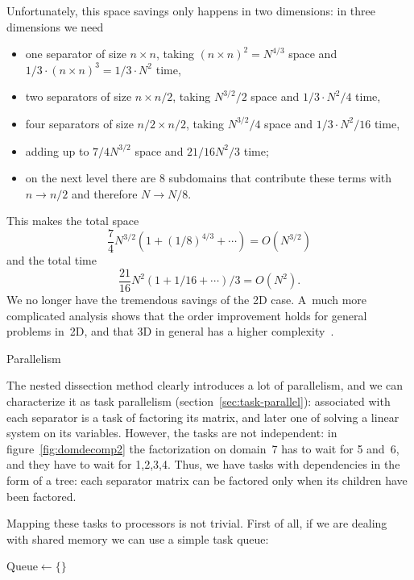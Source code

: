 Unfortunately, this space savings only happens in two dimensions: in three
dimensions we need
\begin{itemize}
\item one separator of size $n\times n$, taking $(n\times
  n)^2=N^{4/3}$ space and $1/3\cdot (n\times n)^3=1/3\cdot N^2$ time,
\item two separators of size $n\times n/2$, taking $N^{3/2}/2$ space and
  $1/3\cdot N^2/4$ time,
\item four separators of size $n/2\times n/2$, taking $N^{3/2}/4$ space
  and $1/3\cdot N^2/16$ time,
\item adding up to $7/4 N^{3/2}$ space and $21/16 N^2/3$ time;
\item on the next level there are 8 subdomains that contribute these
  terms with $n\rightarrow n/2$ and therefore $N\rightarrow N/8$.
\end{itemize}
This makes the total space
\[ \frac{7}{4}N^{3/2}(1+(1/8)^{4/3}+\cdots)=O(N^{3/2}) \]
and the total time
\[ \frac{21}{16}N^2(1+1/16+\cdots)/3=O(N^2). \]
We no longer have the tremendous savings of the 2D case.
A~much more complicated analysis shows that the
order improvement holds for general problems in~2D, and that 3D in
general has a higher
complexity~\cite{LiRoTa:dissection}.

 {Parallelism}
\label{sec:dissect-parallel}

The nested dissection method clearly introduces a lot of parallelism,
and we can characterize it as task parallelism
(section~\ref{sec:task-parallel}): associated with each separator is a
task of factoring its matrix, and later one of solving a linear system
on its variables.  However, the tasks are not independent: in
figure~\ref{fig:domdecomp2} the factorization on domain~7 has to wait
for 5 and~6, and they have to wait for 1,2,3,4.
Thus, we have tasks with dependencies in the form of a tree: each
separator matrix can be factored only when its children have been
factored.

Mapping these tasks to processors is not trivial. First of all, if we
are dealing with shared memory we can use a simple task queue:

\begin{displayalgorithm}
  \label{fig:taskqueue}
  $\mbox{Queue}\leftarrow\{\}$\;
        {
        }
\end{displayalgorithm}

